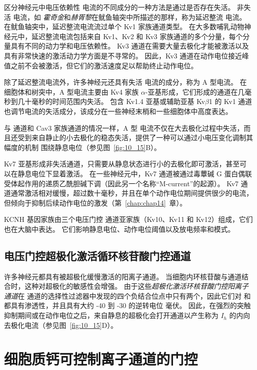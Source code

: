区分神经元中电压依赖性  电流的不同成分的一种方法是通过是否存在失活。
非失活  电流，如 \textit{霍奇金}和\textit{赫胥黎}在鱿鱼轴突中所描述的那样，称为延迟整流  电流。
在鱿鱼轴突中，延迟整流电流流过单个 Kv1 家族通道类型。
在大多数哺乳动物神经元中，延迟整流电流包括来自 Kv1、Kv2 和 Kv3 家族通道的多个分量，每个分量具有不同的动力学和电压依赖性。
Kv3 通道在需要大量去极化才能被激活以及具有非常快速的激活动力学方面是不寻常的。
因此，Kv3 通道在动作电位接近峰值之前不会被激活，但它们的激活速度足以帮助终止动作电位。


除了延迟整流电流外，许多神经元还具有失活  电流的成分，称为 A 型电流。
在细胞体和树突中，A 型电流主要由 Kv4 家族 $\alpha$-亚基形成，它们形成的通道在几毫秒到几十毫秒的时间范围内失活。
包含 Kv1.4 亚基或辅助亚基 Kv$\beta$1 的 Kv1 通道也调节电流的失活成分，该成分在一些神经末梢和一些细胞体中高度表达。


与  通道和 Cav3 家族通道的情况一样，A 型  电流不仅在大去极化过程中失活，而且还受到来自静止的小去极化的稳态失活，提供了一种可以通过小电压变化调制其幅度的机制 围绕静息电位（参见图~\ref{fig:10_15}B）。


Kv7 亚基形成非失活通道，只需要从静息状态进行小的去极化即可激活，甚至可以在静息电位下显着激活。
在一些神经元中，Kv7 通道被通过毒蕈碱 G 蛋白偶联受体起作用的递质乙酰胆碱下调（因此另一个名称“M-current”的起源）。
Kv7 通道通常激活相对缓慢，超过数十毫秒，并且在单个动作电位期间提供很少的电流，但倾向于抑制后续动作电位的激发（第~\ref{chap:chap14}~章）。


KCNH 基因家族由三个电压门控  通道亚家族（Kv10、Kv11 和 Kv12）组成，它们也在大脑中表达。
它们影响静息电位、动作电位阈值以及放电频率和模式。



\subsection{电压门控超极化激活循环核苷酸门控通道}

许多神经元都具有被超极化缓慢激活的阳离子通道。
当细胞内环核苷酸与通道结合时，这种对超极化的敏感性会增强。
由于这些\textit{超极化激活环核苷酸门控阳离子通道}在  通道的选择性过滤器中发现的四个负结合位点中只有两个，因此它们对  和  都具有渗透性，并且具有大约 -40 到 -30 的逆转电位 毫伏。
因此，在强烈的突触抑制期间或在动作电位之后，来自静息的超极化会打开通道以产生称为 $I_h$ 的内向去极化电流（参见图~\ref{fig:10_15}D）。



\section{细胞质钙可控制离子通道的门控}

